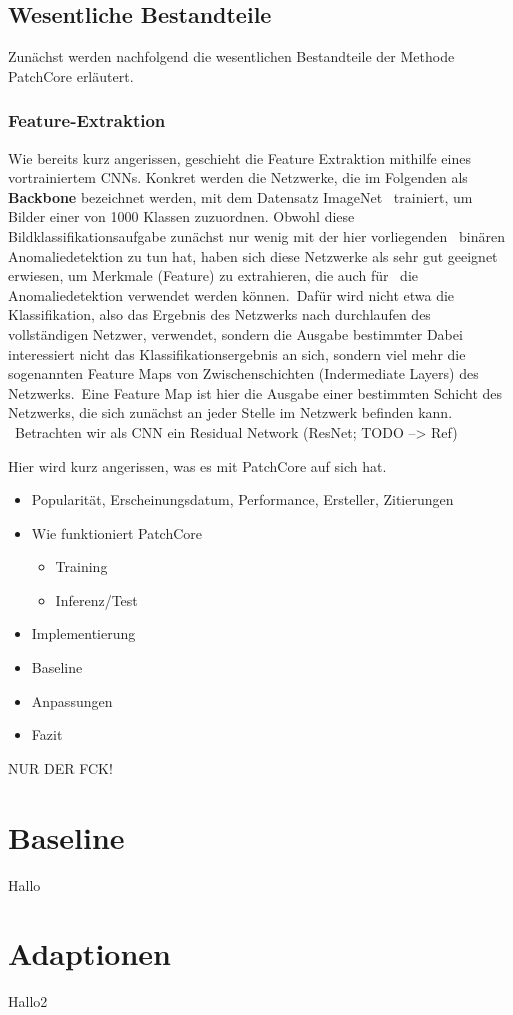 \subsection{Wesentliche Bestandteile}\label{subsec:WesentlicheBestandteile}
Zunächst werden nachfolgend die wesentlichen Bestandteile der Methode PatchCore erläutert.\
\subsubsection{Feature-Extraktion}\label{subsubsec:FeatureExtraction}
Wie bereits kurz angerissen, geschieht die Feature Extraktion mithilfe eines vortrainiertem CNNs. 
Konkret werden die Netzwerke, die im Folgenden als \textbf{Backbone} bezeichnet werden, mit dem Datensatz \glqq ImageNet\grqq{} \
trainiert, um Bilder einer von 1000 Klassen zuzuordnen. Obwohl diese Bildklassifikationsaufgabe zunächst nur wenig mit der hier vorliegenden \
binären Anomaliedetektion zu tun hat, haben sich diese Netzwerke als sehr gut geeignet erwiesen, um Merkmale (Feature) zu extrahieren, die auch für \
die Anomaliedetektion verwendet werden können.\
Dafür wird nicht etwa die Klassifikation, also das Ergebnis des Netzwerks nach durchlaufen des vollständigen Netzwer, verwendet, sondern die Ausgabe bestimmter  
Dabei interessiert nicht das Klassifikationsergebnis an sich, sondern viel mehr die sogenannten \glqq Feature Maps\grqq{} von Zwischenschichten (Indermediate Layers) des Netzwerks.\
Eine Feature Map ist hier die Ausgabe einer bestimmten Schicht des Netzwerks, die sich zunächst an jeder Stelle im Netzwerk befinden kann. \
Betrachten wir als CNN ein Residual Network (ResNet; TODO --> Ref)




\label{ch:PatchCore} Hier wird kurz angerissen, was es mit PatchCore auf sich hat. 
\begin{itemize}
    \item Popularität, Erscheinungsdatum, Performance, Ersteller, Zitierungen
    \item Wie funktioniert PatchCore
    \begin{itemize}
        \item Training
        \item Inferenz/Test
    \end{itemize}
    \item Implementierung
    \item Baseline
    \item Anpassungen
    \item Fazit
\end{itemize}
NUR DER FCK!

\section{Baseline}
\label{sec:Baseline}
Hallo

\section{Adaptionen}
\label{sec:Adaptionen}
Hallo2